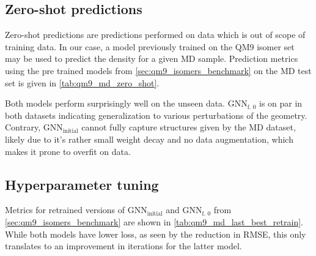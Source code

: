 \subsection{Zero-shot predictions}
\label{sec:qm9_md_isomers_zero_shot}
Zero-shot predictions are predictions performed on data which is out of scope of training data. In our case, a model previously trained on the QM9  isomer set may be used to predict the density for a given MD sample. Prediction metrics using the pre trained models from \autoref{sec:qm9_isomers_benchmark} on the MD test set is given in \autoref{tab:qm9_md_zero_shot}. 
\begin{table}[h]
    \centering
    \caption[GNN zero-shot predictions on QM9  isomer MD]{GNN zero-shot predictions on the QM9  isomer MD test set. $\text{GNN}_\text{initial}$ and $\text{GNN}_\text{f. 0}$ were trained using the QM9  isomer set.}
    \label{tab:qm9_md_zero_shot}
\end{table}
Both models perform surprisingly well on the unseen data. $\text{GNN}_\text{f. 0}$ is on par in both datasets indicating generalization to various perturbations of the geometry. Contrary, $\text{GNN}_\text{initial}$ cannot fully capture structures given by the MD dataset, likely due to it's rather small weight decay and no data augmentation, which makes it prone to overfit on data. 


\subsection{Hyperparameter tuning}
\label{sec:qm9_md_isomers_hyp_tuning}
Metrics for retrained versions of $\text{GNN}_\text{initial}$ and $\text{GNN}_\text{f. 0}$ from \autoref{sec:qm9_isomers_benchmark} are shown in \autoref{tab:qm9_md_last_best_retrain}. While both models have lower loss, as seen by the reduction in RMSE, this only translates to an improvement in iterations for the latter model. 

